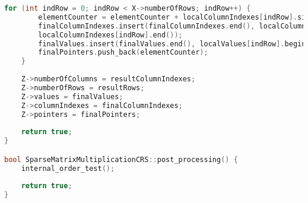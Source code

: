 \documentclass[a4paper, 14pt]{article}
\theoremstyle{plain}
\begin{document}
\begin{lstlisting}[language=C++,caption=Файл sparse\_matmult\_crs.cpp]
	for (int indRow = 0; indRow < X->numberOfRows; indRow++) {
		elementCounter = elementCounter + localColumnIndexes[indRow].size();
		finalColumnIndexes.insert(finalColumnIndexes.end(), localColumnIndexes[indRow].begin(),
		localColumnIndexes[indRow].end());
		finalValues.insert(finalValues.end(), localValues[indRow].begin(), localValues[indRow].end());
		finalPointers.push_back(elementCounter);
	}
	
	Z->numberOfColumns = resultColumnIndexes;
	Z->numberOfRows = resultRows;
	Z->values = finalValues;
	Z->columnIndexes = finalColumnIndexes;
	Z->pointers = finalPointers;
	
	return true;
}

bool SparseMatrixMultiplicationCRS::post_processing() {
	internal_order_test();
	
	return true;
}
\end{lstlisting}
\end{document}
